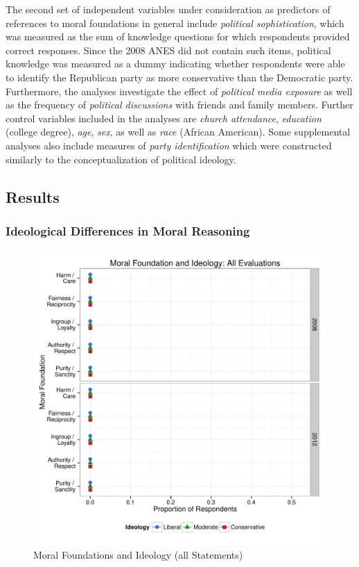 \documentclass[12pt]{article}
\begin{document}
The second set of independent variables under consideration as predictors of references to moral foundations in general include \textit{political sophistication}, which was measured as the sum of knowledge questions for which respondents provided correct responses. Since the 2008 ANES did not contain such items, political knowledge was measured as a dummy indicating whether respondents were able to identify the Republican party as more conservative than the Democratic party. Furthermore, the analyses investigate the effect of \textit{political media exposure} as well as the frequency of \textit{political discussions} with friends and family members. Further control variables included in the analyses are \textit{church attendance}, \textit{education} (college degree), \textit{age}, \textit{sex}, as well as \textit{race} (African American). Some supplemental analyses also include measures of \textit{party identification} which were constructed similarly to the conceptualization of political ideology.


\subsection{Results}

\subsubsection{Ideological Differences in Moral Reasoning}

\begin{figure}[ht]\centering
\includegraphics[scale=.6]{../calc/fig/p1_mft_ideol.pdf}
\caption{Moral Foundations and Ideology (all Statements)}\label{fig:mft_ideol}
\end{figure}
\end{document}
